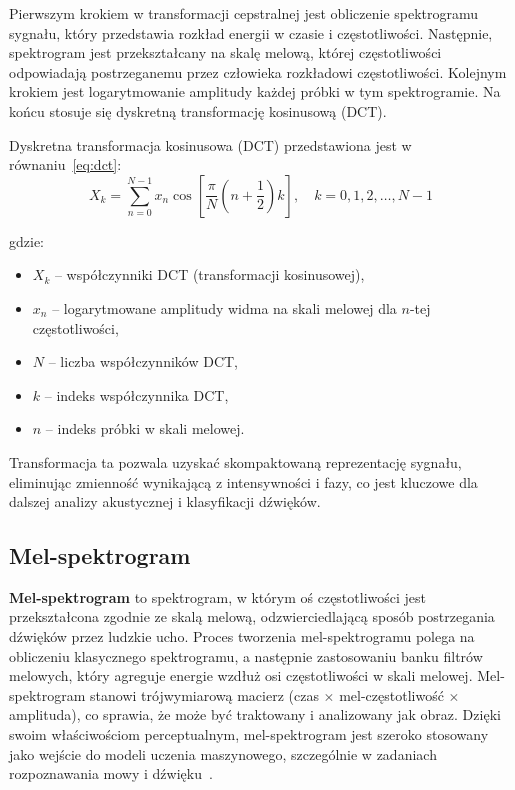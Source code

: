 \documentclass{SGGW-thesis}
\begin{document}
Pierwszym krokiem w transformacji cepstralnej jest obliczenie spektrogramu sygnału, który przedstawia rozkład energii w czasie i częstotliwości. Następnie, spektrogram jest przekształcany na skalę melową, której częstotliwości odpowiadają postrzeganemu przez człowieka rozkładowi częstotliwości. Kolejnym krokiem jest logarytmowanie amplitudy każdej próbki w tym spektrogramie. Na końcu stosuje się dyskretną transformację kosinusową (DCT).

Dyskretna transformacja kosinusowa (DCT) przedstawiona jest w równaniu~\ref{eq:dct}:
\begin{equation}
X_k = \sum_{n=0}^{N-1} x_n \cos \left[ \frac{\pi}{N} \left( n + \frac{1}{2} \right) k \right], \quad k = 0, 1, 2, \dots, N-1
\label{eq:dct}
\end{equation}

gdzie:
\begin{itemize}
    \renewcommand{\labelitemi}{}
    \item \( X_k \) – współczynniki DCT (transformacji kosinusowej),
    \item \( x_n \) – logarytmowane amplitudy widma na skali melowej dla \( n \)-tej częstotliwości,
    \item \( N \) – liczba współczynników DCT,
    \item \( k \) – indeks współczynnika DCT,
    \item \( n \) – indeks próbki w skali melowej.
\end{itemize}

Transformacja ta pozwala uzyskać skompaktowaną reprezentację sygnału, eliminując zmienność wynikającą z intensywności i fazy, co jest kluczowe dla dalszej analizy akustycznej i klasyfikacji dźwięków.

\subsection{Mel-spektrogram}
\textbf{Mel-spektrogram} to spektrogram, w którym oś częstotliwości jest przekształcona zgodnie ze skalą melową, odzwierciedlającą sposób postrzegania dźwięków przez ludzkie ucho. Proces tworzenia mel-spektrogramu polega na obliczeniu klasycznego spektrogramu, a następnie zastosowaniu banku filtrów melowych, który agreguje energie wzdłuż osi częstotliwości w skali melowej. Mel-spektrogram stanowi trójwymiarową macierz (czas $\times$ mel-częstotliwość $\times$ amplituda), co sprawia, że może być traktowany i analizowany jak obraz. Dzięki swoim właściwościom perceptualnym, mel-spektrogram jest szeroko stosowany jako wejście do modeli uczenia maszynowego, szczególnie w zadaniach rozpoznawania mowy i dźwięku~\cite{thornton2019audio}.
\end{document}
